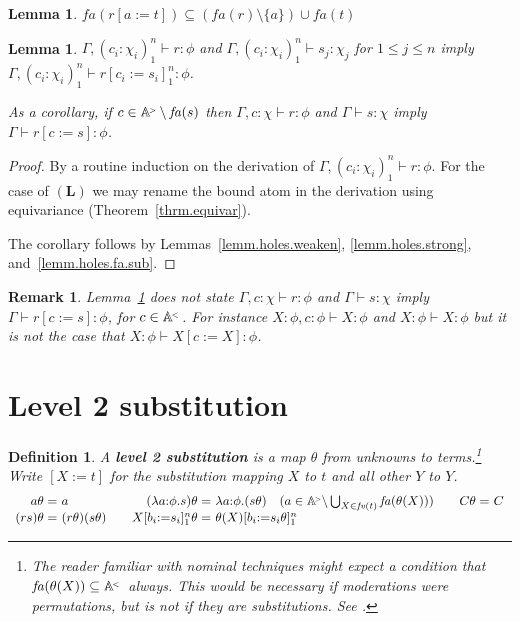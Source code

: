 \documentclass[submission,copyright]{eptcs}
\newtheorem{lemm}[thrm]{Lemma}
\newtheorem{defn}[thrm]{Definition}
\newtheorem{rmrk}[thrm]{Remark}
\newcommand{\rtm}{r}
\newcommand{\stm}{s}
\newcommand{\ttm}{t}
\newcommand{\deffont}[1]{\textbf{#1}}
\newcommand{\f}[1]{\ensuremath{\text{$\mathit{#1}$}}}
\newcommand{\lam}[1]{\lambda{#1}.}
\newcommand{\rulefont}[1]{\ensuremath{(\mathbf{#1})}}
\newcommand{\ssm}{:=}
\newcommand{\fa}{\f{fa}}
\newcommand{\fv}{\f{fv}}
\newcommand\cent{\vdash}
\newcommand\atomsdown{\mathbb A^{\hspace{-.3ex}{}_{{}^<}}}
\newcommand\atomsup{\mathbb A^{\hspace{-.3ex}{}_{{}^>}\!}} \newcommand\basesort{\tau}
\begin{document}
\begin{lemm}
\label{lemm.level.one.subst.reduces.free.atoms} 
\label{lemm.holes.fa.sub}
$\f{fa}(\rtm[a \ssm \ttm]) \subseteq (\f{fa}(\rtm) \setminus \{ a \}) \cup \f{fa}(\ttm)$
\end{lemm}

\begin{lemm}
\label{lemm.hole.sub.single}
$\Gamma,(c_i{:}\chi_i)_1^n\cent r:\phi$ and $\Gamma,(c_i{:}\chi_i)_1^n\cent \stm_j:\chi_j$ for $1{\leq}j{\leq}n$ imply $\Gamma,(c_i{:}\chi_i)_1^n\cent \rtm[c_i\ssm\stm_i]_1^n:\phi$.

As a corollary, if $c\in\atomsup\setminus\fa(s)$ then $\Gamma,c{:}\chi\cent r:\phi$ and $\Gamma\cent s:\chi$ imply $\Gamma\cent r[c\ssm s]:\phi$. 
\end{lemm}
\begin{proof}
By a routine induction on the derivation of $\Gamma,(c_i{:}\chi_i)_1^n\cent r:\phi$.
For the case of \rulefont{L} we may rename the bound atom in the derivation using equivariance (Theorem~\ref{thrm.equivar}).


The corollary follows by Lemmas~\ref{lemm.holes.weaken}, \ref{lemm.holes.strong}, and~\ref{lemm.holes.fa.sub}.
\end{proof}

\begin{rmrk}
\label{rmrk.discussion.why}
Lemma~\ref{lemm.hole.sub.single} does not state $\Gamma,c{:}\chi\cent \rtm:\phi$ and 
$\Gamma\cent \stm:\chi$ 
imply 
$\Gamma\cent \rtm[c\ssm\stm]:\phi$, for $c\in\atomsdown$.
For instance $X{:}\phi,c{:}\phi\cent X:\phi$ and $X{:}\phi\cent X:\phi$ but it is not the case that $X{:}\phi\cent X[c\ssm X]:\phi$.
\end{rmrk}



\section{Level 2 substitution}
\label{sect.level.2.substitution}

\begin{defn}
\label{defn.st.sub.2}
A \deffont{level 2 substitution} is a map $\theta$ from unknowns to terms.\footnote{The reader familiar with nominal techniques might expect a condition that $\fa(\theta(X))\subseteq\atomsdown$ always.
This would be necessary if moderations were permutations, but is not if they are substitutions.
See \cite[Proposition~3.4.3]{gabbay:nomtnl}.}
Write $[X\ssm t]$ for the substitution mapping $X$ to $t$ and all other $Y$ to $Y$.
$$
\begin{array}{r@{\ }l@{\qquad}r@{\ }l@{\qquad}r@{\ }l}
a\theta          = & a             
& 
(\lam{a{:}\phi}\stm)\theta = & \lam{a{:}\phi}(\stm\theta) \quad (a\in\atomsup{\setminus}\bigcup_{X\in\fv(t)}\fa(\theta(X)))
&
C\theta =&C
\\
(\rtm\stm)\theta = & (\rtm\theta)(\stm\theta) 
& 
X[b_i{\ssm}s_i]_1^n\theta = & \theta(X)[b_i{\ssm}s_i\theta]_1^n
\end{array}
$$
\end{defn}
\end{document}

